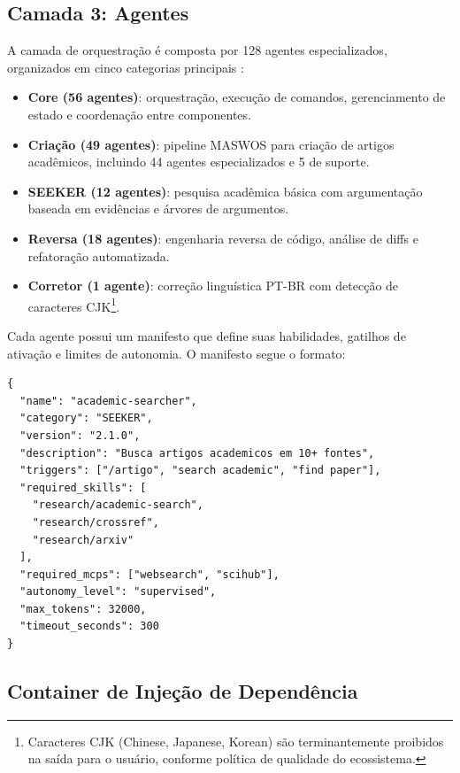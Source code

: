 \subsection{Camada 3: Agentes}
\label{subsec:camada-agentes}

A camada de orquestração é composta por 128 agentes especializados,
organizados em cinco categorias principais \cite{wooldridge2009multiagent,
weiss2013multiagent}:

\begin{itemize}
\item \textbf{Core (56 agentes)}: orquestração, execução de comandos,
gerenciamento de estado e coordenação entre componentes.
\item \textbf{Criação (49 agentes)}: pipeline MASWOS para criação de
artigos acadêmicos, incluindo 44 agentes especializados e 5 de suporte.
\item \textbf{SEEKER (12 agentes)}: pesquisa acadêmica básica com
argumentação baseada em evidências e árvores de argumentos.
\item \textbf{Reversa (18 agentes)}: engenharia reversa de código,
análise de diffs e refatoração automatizada.
\item \textbf{Corretor (1 agente)}: correção linguística PT-BR com
detecção de caracteres CJK\footnote{Caracteres CJK (Chinese, Japanese,
Korean) são terminantemente proibidos na saída para o usuário,
conforme política de qualidade do ecossistema.}.
\end{itemize}

Cada agente possui um manifesto que define suas habilidades, gatilhos de
ativação e limites de autonomia. O manifesto segue o formato:

\begin{lstlisting}[style=pythonstyle, caption={Exemplo de manifesto de agente},
                   label={lst:agent-manifest}]
{
  "name": "academic-searcher",
  "category": "SEEKER",
  "version": "2.1.0",
  "description": "Busca artigos academicos em 10+ fontes",
  "triggers": ["/artigo", "search academic", "find paper"],
  "required_skills": [
    "research/academic-search",
    "research/crossref",
    "research/arxiv"
  ],
  "required_mcps": ["websearch", "scihub"],
  "autonomy_level": "supervised",
  "max_tokens": 32000,
  "timeout_seconds": 300
}
\end{lstlisting}

\subsection{Container de Injeção de Dependência}
\label{subsec:container-di}


